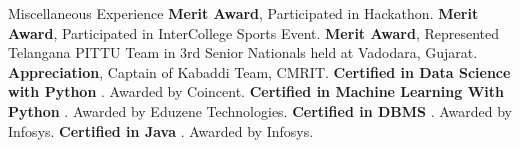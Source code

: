 \begin{rubric}{Miscellaneous Experience}
\entry*[2021] \textbf{Merit Award}, Participated in Hackathon.
%
\entry*[2022] \textbf{Merit Award}, Participated in InterCollege Sports Event.
%
\entry*[2022] \textbf{Merit Award}, Represented Telangana PITTU Team in 3rd Senior Nationals held at Vadodara, Gujarat.
%
\entry*[2022] \textbf{Appreciation}, Captain of Kabaddi Team, CMRIT.
%
\entry*[2022] \textbf{Certified in Data Science with Python }. Awarded by Coincent.
%
\entry*[2022] \textbf{Certified in Machine Learning With Python }. Awarded by Eduzene Technologies.
%
\entry*[2022] \textbf{Certified in DBMS }. Awarded by Infosys.
%
\entry*[2022] \textbf{Certified in Java }. Awarded by Infosys.
%
\end{rubric}
